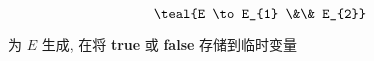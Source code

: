 \begin{frame}{}
  \begin{center}
    \vspace{-0.50cm}
    \[
      \teal{E \to E_{1} \&\& E_{2}}
    \]

    为 $E$ 生成,
    在将 {\bf true} 或 {\bf false} 存储到临时变量
  \end{center}
\end{frame}

\begin{frame}{}
  \begin{center}

  \end{center}
\end{frame}




